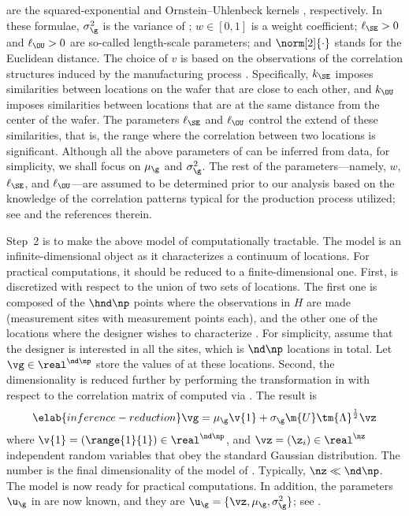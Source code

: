 are the squared-exponential and Ornstein--Uhlenbeck kernels
\cite{rasmussen2006}, respectively. In these formulae, $\sigma_\g^2$ is the
variance of \g; $w \in [0, 1]$ is a weight coefficient; $\ell_\SE > 0$ and
$\ell_\OU > 0$ are so-called length-scale parameters; and $\norm[2]{\cdot}$
stands for the Euclidean distance. The choice of $v$ is based on the
observations of the correlation structures induced by the manufacturing process
\cite{chandrakasan2000, cheng2011}. Specifically, $k_\SE$ imposes similarities
between locations on the wafer that are close to each other, and $k_\OU$
imposes similarities between locations that are at the same distance from the
center of the wafer. The parameters $\ell_\SE$ and $\ell_\OU$ control the
extend of these similarities, that is, the range where the correlation between
two locations is significant. Although all the above parameters of \g can be
inferred from data, for simplicity, we shall focus on $\mu_\g$ and
$\sigma_\g^2$. The rest of the parameters---namely, $w$, $\ell_\SE$, and
$\ell_\OU$---are assumed to be determined prior to our analysis based on the
knowledge of the correlation patterns typical for the production process
utilized; see \cite{marzouk2009} and the references therein.

Step~2 is to make the above model of \g computationally tractable. The model is
an infinite-dimensional object as it characterizes a continuum of locations. For
practical computations, it should be reduced to a finite-dimensional one. First,
\g is discretized with respect to the union of two sets of locations. The first
one is composed of the $\hnd \np$ points where the observations in $H$ are made
(\hnd measurement sites with \np measurement points each), and the other one of
the locations where the designer wishes to characterize \g. For simplicity,
assume that the designer is interested in all the sites, which is $\nd \np$
locations in total. Let $\vg \in \real^{\nd \np}$ store the values of \g at
these locations. Second, the dimensionality is reduced further by performing the
transformation in  with respect to the correlation
matrix of \vg computed via . The result is
\begin{equation} \elab{inference-reduction}
  \vg = \mu_\g \v{1} + \sigma_\g \m{U} \tm{\Lambda}^\frac{1}{2} \vz
\end{equation}
where $\v{1} = (\range{1}{1}) \in \real^{\nd \np}$, and $\vz = (\z_i) \in
\real^\nz$ independent random variables that obey the standard Gaussian
distribution. The number \nz is the final dimensionality of the model of \g.
Typically, $\nz \ll \nd \np$. The model is now ready for practical computations.
In addition, the parameters $\u_\g$ in  are now
known, and they are $\u_\g = \{ \vz, \mu_\g, \sigma^2_\g \}$; see
.

